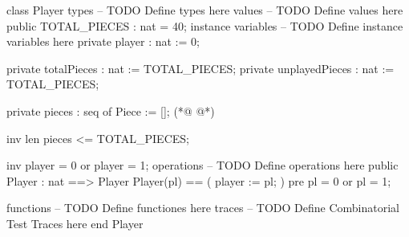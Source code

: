 \begin{vdmpp}[breaklines=true]
class Player
types
-- TODO Define types here
values
-- TODO Define values here
 public TOTAL_PIECES : nat = 40;
instance variables
-- TODO Define instance variables here
 private player : nat := 0;

  private totalPieces : nat := TOTAL_PIECES;
  private unplayedPieces : nat := TOTAL_PIECES;
  
 private pieces : seq of Piece := [];
(*@
\label{Player:15}
@*)
 
 inv len pieces <= TOTAL_PIECES;
  
  inv player = 0 or player = 1;
operations
-- TODO Define operations here
  public Player : nat ==> Player
   Player(pl) ==
   (
    player := pl;
   )
   pre pl = 0 or pl = 1;
   
functions
-- TODO Define functiones here
traces
-- TODO Define Combinatorial Test Traces here
end Player
\end{vdmpp}
